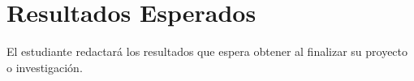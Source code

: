 \chapter{Resultados Esperados}
El estudiante redactará los resultados que espera obtener al finalizar su proyecto o investigación.
